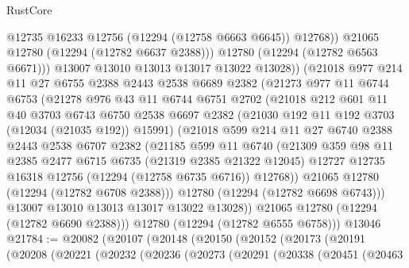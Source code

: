 \begin{lexlean}{RustCore}
\begin{coremodule}
                  @12735
                  @16233
                  @12756
                  (@12294 (@12758 @6663 @6645))
                  @12768))
              @21065
              @12780
              (@12294 (@12782 @6637 @2388)))
            @12780
            (@12294 (@12782 @6563 @6671)))
          @13007
          @13010
          @13013
          @13017
          @13022
          @13028))
      (@21018
        @977
        @214
        @11
        @27
        @6755
        @2388
        @2443
        @2538
        @6689
        @2382
        (@21273
          @977
          @11
          @6744
          @6753
          (@21278
            @976
            @43
            @11
            @6744
            @6751
            @2702
            (@21018
              @212
              @601
              @11
              @40
              @3703
              @6743
              @6750
              @2538
              @6697
              @2382
              (@21030 @192 @11 @192 @3703 (@12034 (@21035 @192)) @15991)
              (@21018
                @599
                @214
                @11
                @27
                @6740
                @2388
                @2443
                @2538
                @6707
                @2382
                (@21185
                  @599
                  @11
                  @6740
                  (@21309
                    @359
                    @98
                    @11
                    @2385
                    @2477
                    @6715
                    @6735
                    (@21319 @2385 @21322 @12045)
                    @12727
                    @12735
                    @16318
                    @12756
                    (@12294 (@12758 @6735 @6716))
                    @12768))
                @21065
                @12780
                (@12294 (@12782 @6708 @2388)))
              @12780
              (@12294 (@12782 @6698 @6743)))
            @13007
            @13010
            @13013
            @13017
            @13022
            @13028))
        @21065
        @12780
        (@12294 (@12782 @6690 @2388)))
      @12780
      (@12294 (@12782 @6555 @6758)))
    @13046
@21784 := @20082
    (@20107
      (@20148
        (@20150
          (@20152
            (@20173
              (@20191
                (@20208
                  (@20221
                    (@20232
                      (@20236
                        (@20273
                          (@20291
                            (@20338
                              (@20451
                                (@20463

\end{coremodule}
\end{lexlean}
